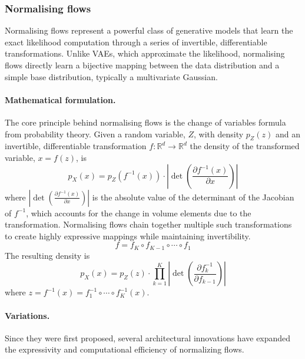     \subsubsection{Normalising flows}
        Normalising flows represent a powerful class of generative models that learn the exact likelihood computation through a series of invertible, differentiable transformations.
        Unlike VAEs, which approximate the likelihood, normalising flows directly learn a bijective mapping between the data distribution and a simple base distribution, typically a multivariate Gaussian.

        \paragraph{Mathematical formulation.}
            The core principle behind normalising flows is the change of variables formula from probability theory.
            Given a random variable, \(Z\), with density \(p_Z(z)\) and an invertible, differentiable transformation \(f:\mathbb{R}^d \rightarrow \mathbb{R}^d\) the density of the transformed variable, \(x = f(z)\), is
            \begin{equation}
                p_X(x) = p_Z(f^{-1}(x)) \cdot \left|\det\left(\frac{\partial f^{-1}(x)}{\partial x}\right)\right|
            \end{equation}
            where \(\left|\det\left(\frac{\partial f^{-1}(x)}{\partial x}\right)\right|\) is the absolute value of the determinant of the Jacobian of \(f^{-1}\), which accounts for the change in volume elements due to the transformation.
            Normalising flows chain together multiple such transformations to create highly expressive mappings while maintaining invertibility.
            \begin{equation}
                f = f_K \circ f_{K-1} \circ \cdots \circ f_1
            \end{equation}
            The resulting density is
            \begin{equation}
                p_X(x) = p_Z(z) \cdot \prod_{k=1}^{K} \left|\det\left(\frac{\partial f_k^{-1}}{\partial f_{k-1}}\right)\right|
            \end{equation}
            where \(z = f^{-1}(x) = f_1^{-1} \circ \cdots \circ f_K^{-1}(x)\).

        \paragraph{Variations.}
            Since they were first proposed, several architectural innovations have expanded the expressivity and computational efficiency of normalizing flows.
            
